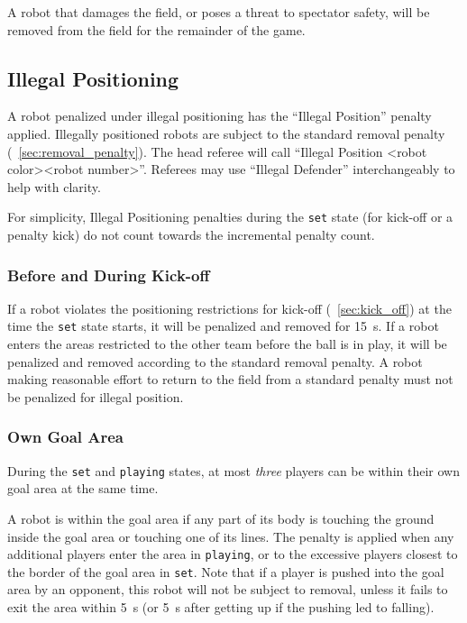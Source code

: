 A robot that damages the field, or poses a threat to spectator safety, will be removed from the field for the remainder of the game.

\subsection{Illegal Positioning}
\label{sec:illegal_positioning}

A robot penalized under illegal positioning has the ``Illegal Position'' penalty applied. Illegally positioned robots are subject to the standard removal penalty (\cf~\cref{sec:removal_penalty}). The head referee will call ``Illegal Position \textless robot color\textgreater \textless robot number\textgreater''. Referees may use ``Illegal Defender'' interchangeably to help with clarity.

For simplicity, Illegal Positioning penalties during the \texttt{set} state (for kick-off or a penalty kick) do not count towards the incremental penalty count.

\subsubsection{Before and During Kick-off}
\label{sec:ip_kick_off}

If a robot violates the positioning restrictions for kick-off (\cf~\cref{sec:kick_off}) at the time the \texttt{set} state starts, it will be penalized and removed for \qty{15}{\second}. If a robot enters the areas restricted to the other team before the ball is in play, it will be penalized and removed according to the standard removal penalty. A robot making reasonable effort to return to the field from a standard penalty must not be penalized for illegal position.

\subsubsection{Own Goal Area}
\label{sec:ip_own_goal_area}

During the \texttt{set} and \texttt{playing} states, at most \textit{three} players can be within their own goal area at the same time.

A robot is within the goal area if any part of its body is touching the ground inside the goal area or touching one of its lines. The penalty is applied when any additional players enter the area in \texttt{playing}, or to the excessive players closest to the border of the goal area in \texttt{set}. Note that if a player is pushed into the goal area by an opponent, this robot will not be subject to removal, unless it fails to exit the area within \qty{5}{\second} (or \qty{5}{\second} after getting up if the pushing led to falling).

